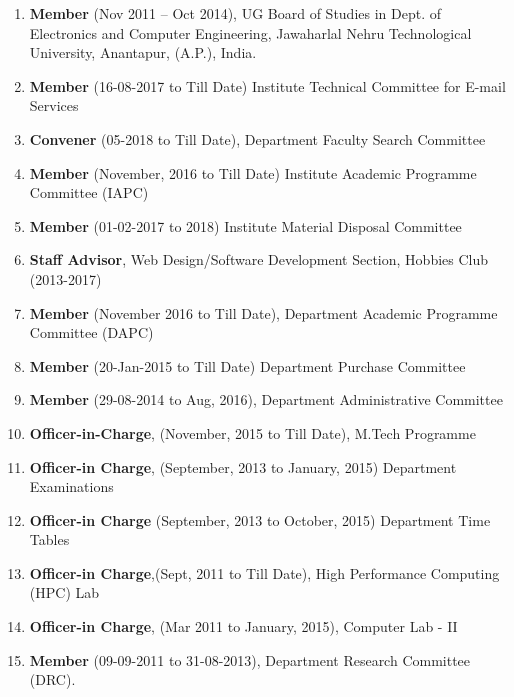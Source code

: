 \begin{enumerate}


\item
\textbf{Member} (Nov 2011 – Oct 2014), UG Board of Studies in Dept. of Electronics and Computer Engineering, Jawaharlal Nehru Technological University, Anantapur, (A.P.), India.

\item
\textbf{Member} (16-08-2017 to Till Date) Institute Technical Committee for E-mail Services

\item
\textbf{Convener} (05-2018 to Till Date), Department Faculty Search Committee

\item
\textbf{Member }(November, 2016 to Till Date) Institute Academic Programme Committee (IAPC)

\item
\textbf{Member} (01-02-2017 to 2018) Institute Material Disposal Committee

\item 
\textbf{Staff Advisor}, Web Design/Software Development Section, Hobbies Club (2013-2017)

\item
\textbf{Member} (November 2016 to Till Date), Department Academic Programme Committee (DAPC)

\item
\textbf{Member} (20-Jan-2015 to Till Date) Department Purchase Committee

\item
\textbf{Member} (29-08-2014 to Aug, 2016), Department Administrative Committee

\item
\textbf{Officer-in-Charge}, (November, 2015 to Till Date), M.Tech Programme

\item
\textbf{Officer-in Charge}, (September, 2013 to January, 2015) Department Examinations

\item
\textbf{Officer-in Charge }(September, 2013 to October, 2015) Department Time Tables

\item
\textbf{Officer-in Charge},(Sept, 2011 to Till Date), High Performance Computing (HPC) Lab 

\item
\textbf{Officer-in Charge}, (Mar 2011 to January, 2015), Computer Lab - II

\item
\textbf{Member} (09-09-2011 to 31-08-2013), Department Research Committee (DRC).


\end{enumerate}
